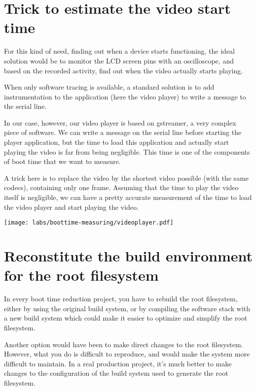 \section{Trick to estimate the video start time} 

For this kind of need, finding out when a device starts functioning, 
the ideal solution would be to monitor the LCD screen pins with an
oscilloscope, and based on the recorded activity, find out when the 
video actually starts playing.

When only software tracing is available, a standard solution is to
add instrumentation to the application (here the video player) to write a message to 
the serial line.

In our case, however, our video player is based on gstreamer, a very
complex piece of software. We can write a message on the serial line
before starting the player application, but the time to load this
application and actually start playing the video is far from being
negligible. This time is one of the components of boot time that we want to
measure. 

A trick here is to replace the video by the shortest video possible
(with the same codecs), containing only one frame. Assuming that
the time to play the video itself is negligible, we can have a pretty
accurate measurement of the time to load the video player and start
playing the video.

\begin{center}
\texttt{[image: labs/boottime-measuring/videoplayer.pdf]}
\end{center}

\section{Reconstitute the build environment for the root filesystem}

In every boot time reduction project, you have to rebuild the root
filesystem, either by using the original build system, or by compiling
the software stack with a new build system which could make it
easier to optimize and simplify the root filesystem.

Another option would have been to make direct changes to the root
filesystem. However, what you do is difficult to reproduce, and would
make the system more difficult to maintain. In a real production
project, it's much better to make changes to the configuration of
the build system used to generate the root filesystem.

